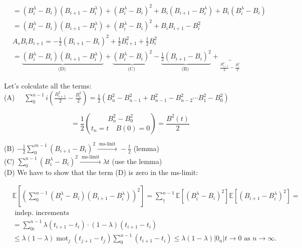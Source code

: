 \documentclass[10pt]{article}
\begin{document}
$$
\begin{aligned}
& =\left(B_{i}^{\lambda}-B_{i}\right)\left(B_{i+1}-B_{i}^{\lambda}\right)+\left(B_{i}^{\lambda}-B_{i}\right)^{2}+B_{i}\left(B_{i+1}-B_{i}^{\lambda}\right)+B_{i}\left(B_{i}^{\lambda}-B_{i}\right) \\
& =\left(B_{i}^{\lambda}-B_{i}\right)\left(B_{i+1}-B_{i}^{\lambda}\right)+\left(B_{i}^{\lambda}-B_{i}\right)^{2}+B_{i} B_{i+1}-B_{i}^{2} \\
& A_{s} B_{i} B_{i+1}=-\frac{1}{2}\left(B_{i+1}-B_{i}\right)^{2}+\frac{1}{2} B_{i+1}^{2}+\frac{1}{2} B_{i}^{2} \\
& =\underbrace{\left(B_{i}^{\lambda}-B_{i}\right)\left(B_{i+1}-B_{i}^{\lambda}\right)}_{\text {(D) }}+\underbrace{\left(B_{i}^{\lambda}-B_{i}\right)^{2}}_{\text {(C) }}-\underbrace{\frac{1}{2}\left(B_{i+1}-B_{i}\right)^{2}}_{\text {(B) }}+\underbrace{}_{\frac{B_{i+1}^{2}}{2}-\frac{B_{i}^{2}}{2}}
\end{aligned}
$$

Let's colculate all the terms:\\
(A) $\quad \sum_{0}^{n-1} i\left(\frac{B_{i+1}^{2}}{2}-\frac{B_{i}^{2}}{2}\right)=\frac{1}{2}\left(B_{n}^{2}-B_{n-1}^{2}+B_{n-1}^{2}-B_{n-2}^{2} \cdots B_{1}^{2}-B_{0}^{2}\right)$

$$
=\frac{1}{2}\binom{B_{n}^{2}-B_{0}^{2}}{t_{n}=t \quad B(0)=0}=\frac{B^{2}(t)}{2}
$$

(B) $-\frac{1}{2} \sum_{0}^{m-1}\left(B_{i+1}-B_{i}\right)^{2} \xrightarrow{\text { ms-linit }}-\frac{t}{2}$ (lemma)\\
(C) $\sum_{0}^{n-1}\left(B_{i}^{\lambda}-B_{i}\right)^{2} \xrightarrow{\text { ms-limit }} \lambda t$ (use the lemma)\\
(D) We have to show that the term (D) is zero in the ms-limit:

$$
\begin{aligned}
& \mathbb{E}\left[\left(\sum_{0}^{n-1}\left(B_{i}^{\lambda}-B_{i}\right)\left(B_{i+1}-B_{i}^{\lambda}\right)\right)^{2}\right]=\sum_{\uparrow}^{n-1} \mathbb{E}\left[\left(B_{i}^{\lambda}-B_{i}\right)^{2}\right] \mathbb{E}\left[\left(B_{i+1}-B_{i}^{\lambda}\right)^{2}\right]= \\
& \text { indep. increments } \\
& =\sum_{0 i}^{n-1} \lambda\left(t_{i+1}-t_{i}\right) \cdot(1-\lambda)\left(t_{i+1}-t_{i}\right) \\
& \leq \lambda(1-\lambda) \operatorname{mot}_{j}\left(t_{j+1}-t_{j}\right) \sum_{0}^{n-1}\left(t_{i+1}-t_{i}\right) \leq \lambda(1-\lambda)\left|0_{n}\right| t \rightarrow 0 \text { as } n \rightarrow \infty .
\end{aligned}
$$
\end{document}
